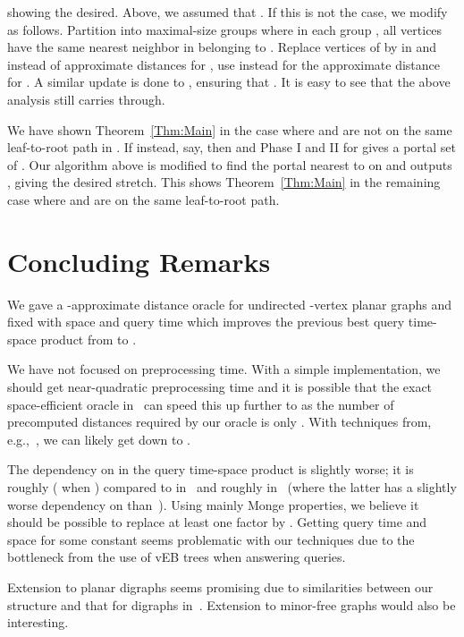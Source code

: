 \documentclass[11pt]{article}
\begin{document}
showing the desired. Above, we assumed that . If this is not the case, we modify  as follows. Partition  into maximal-size groups where in each group , all vertices  have the same nearest neighbor  in  belonging to . Replace vertices of  by  in  and instead of approximate distances  for , use instead  for the approximate distance for . A similar update is done to , ensuring that . It is easy to see that the above analysis still carries through.

We have shown Theorem~\ref{Thm:Main} in the case where  and  are not on the same leaf-to-root path in . If instead, say,  then  and Phase I and II for  gives a portal set of . Our algorithm above is modified to find the portal  nearest to  on  and outputs , giving the desired stretch. This shows Theorem~\ref{Thm:Main} in the remaining case where  and  are on the same leaf-to-root path.

\section{Concluding Remarks}\label{sec:ConclRem}
We gave a -approximate distance oracle for undirected -vertex planar graphs and fixed  with  space and  query time which improves the previous best query time-space product from  to .

We have not focused on preprocessing time. With a simple implementation, we should get near-quadratic preprocessing time and it is possible that the exact space-efficient oracle in~\cite{ExactOraclePlanarMozesSommer} can speed this up further to  as the number of precomputed distances required by our oracle is only . With techniques from, e.g.,~\cite{OraclePlanarKlein, OraclePlanarThorup}, we can likely get down to .

The dependency on  in the query time-space product is slightly worse; it is roughly  ( when ) compared to  in~\cite{OraclePlanarKlein, OraclePlanarThorup} and roughly  in~\cite{CompactOraclesPlanar} (where the latter has a slightly worse dependency on  than~\cite{OraclePlanarKlein, OraclePlanarThorup}). Using mainly Monge properties, we believe it should be possible to replace at least one  factor by . Getting  query time and  space for some constant  seems problematic with our techniques due to the  bottleneck from the use of vEB trees when answering queries.

Extension to planar digraphs seems promising due to similarities between our structure and that for digraphs in~\cite{OraclePlanarThorup}. Extension to minor-free graphs would also be interesting.
\end{document}
